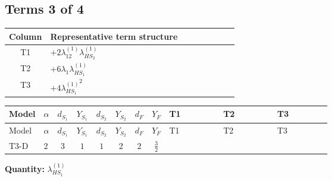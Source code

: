 \documentclass[8pt]{article}
\begin{document}
\begin{landscape}
\subsection*{Terms 3 of 4}
\begin{center}
\begin{tabular}{@{}c >{\raggedright\arraybackslash}p{0.82\linewidth}@{}}
\toprule
Column & Representative term structure \\
\midrule
T1 & \(\displaystyle +2 {\lambda_{12}^{(1)}} {\lambda_{HS_2}^{(1)}}\) \\
\midrule
T2 & \(\displaystyle +6 {\lambda_1} {\lambda_{HS_1}^{(1)}}\) \\
\midrule
T3 & \(\displaystyle +4 {\lambda_{HS_1}^{(1)}}^2\) \\
\midrule
\bottomrule
\end{tabular}
\end{center}
\smallskip
\tiny
\begin{longtable}{@{}llcccccc >{\raggedright\arraybackslash}p{0.21\linewidth} >{\raggedright\arraybackslash}p{0.21\linewidth} >{\raggedright\arraybackslash}p{0.21\linewidth}@{}}
\toprule
Model & $\alpha$ & $d_{S_1}$ & $Y_{S_1}$ & $d_{S_2}$ & $Y_{S_2}$ & $d_F$ & $Y_F$ & T1 & T2 & T3 \\
\midrule
\endfirsthead
\toprule
Model & $\alpha$ & $d_{S_1}$ & $Y_{S_1}$ & $d_{S_2}$ & $Y_{S_2}$ & $d_F$ & $Y_F$ & T1 & T2 & T3 \\
\midrule
\endhead
T3-D & $2$ & $3$ & $1$ & $1$ & $2$ & $2$ & $\frac{3}{2}$ & \scriptsize\adjustbox{max width=\linewidth}{$\begin{gathered} +2 {\lambda_{12}^{(1)}} {\lambda_{HS_2}^{(1)}}\end{gathered}$} & \scriptsize\adjustbox{max width=\linewidth}{$\begin{gathered} +6 {\lambda_1} {\lambda_{HS_1}^{(1)}}\end{gathered}$} & \scriptsize\adjustbox{max width=\linewidth}{$\begin{gathered} +4 {\lambda_{HS_1}^{(1)}}^2\end{gathered}$} \\
\midrule
\bottomrule
\end{longtable}
\clearpage
\noindent\textbf{Quantity: }$\lambda_{HS_1}^{(1)}$\par\smallskip

\end{landscape}
\end{document}
